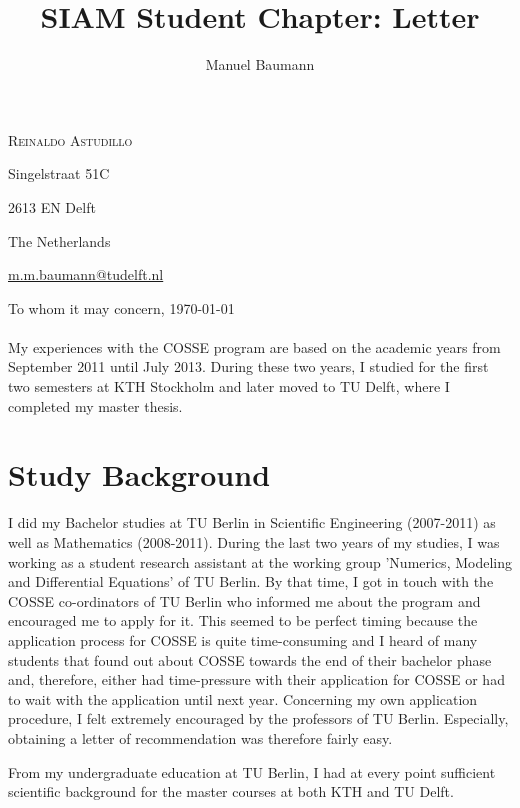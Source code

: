 \documentclass{article}
\title{\bf SIAM Student Chapter: Letter }
\author{Manuel Baumann}
\begin{document}
\hfill \textsc{Reinaldo Astudillo}

\hfill Singelstraat 51C

\hfill 2613 EN Delft

\hfill The Netherlands

\hfill

\hfill \href{mailto:m.m.baumann@tudelft.nl}{m.m.baumann@tudelft.nl}


\vspace{2cm}

To whom it may concern, \hfill \today
\\ \\
My experiences with the COSSE program are based on the academic years from September 2011 until July 2013. During these two years, I studied for the first two semesters at KTH Stockholm and later moved to TU Delft, where I completed my master thesis.
\section*{Study Background}
I did my Bachelor studies at TU Berlin in Scientific Engineering (2007-2011) as well as Mathematics (2008-2011). During the last two years of my studies, I was working as a student research assistant at the working group 'Numerics, Modeling and Differential Equations' of TU Berlin. By that time, I got in touch with the COSSE co-ordinators of TU Berlin who informed me about the program and encouraged me to apply for it. This seemed to be perfect timing because the application process for COSSE is quite time-consuming and I heard of many students that found out about COSSE towards the end of their bachelor phase and, therefore, either had time-pressure with their application for COSSE or had to wait with the application until next year. Concerning my own application procedure, I felt extremely encouraged by the professors of TU Berlin. Especially, obtaining a letter of recommendation was therefore fairly easy.

From my undergraduate education at TU Berlin, I had at every point sufficient scientific background for the master courses at both KTH and TU Delft.
\end{document}

